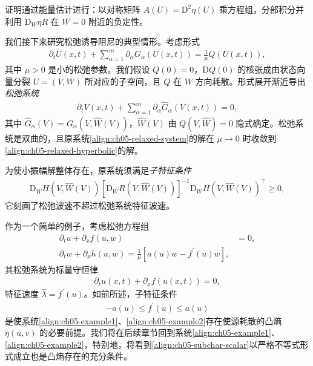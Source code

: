 \documentclass[../../main.tex]{subfiles}
\begin{document}
证明通过能量估计进行：以对称矩阵 $A(U)=\mathrm{D}^{2}\eta(U)$ 乘方程组，分部积分并利用 $\mathrm{D}_{W}\eta R$ 在 $W=0$ 附近的负定性。

我们接下来研究松弛诱导阻尼的典型情形。考虑形式
\begin{align}
\partial_{t}U(x,t)+\sum_{\alpha=1}^{m}\partial_{\alpha}G_{\alpha}(U(x,t))=\frac{1}{\mu}Q(U(x,t)),\label{align:ch05-relaxed-system}
\end{align}
其中 $\mu>0$ 是小的松弛参数。我们假设 $Q(0)=0$，$\mathrm{D}Q(0)$ 的核张成由状态向量分裂 $U=(V,W)$ 所对应的子空间，且 $Q$ 在 $W$ 方向耗散。形式展开渐近导出\emph{松弛系统}
\begin{align}
\partial_{t}V(x,t)+\sum_{\alpha=1}^{m}\partial_{\alpha}\hat{G}_{\alpha}(V(x,t))=0,\label{align:ch05-relaxed-hyperbolic}
\end{align}
其中 $\hat{G}_{\alpha}(V)=G_{\alpha}(V,\hat{W}(V))$，$\hat{W}(V)$ 由 $Q(V,\hat{W})=0$ 隐式确定。松弛系统是双曲的，且原系统\eqref{align:ch05-relaxed-system}的解在 $\mu\to0$ 时收敛到\eqref{align:ch05-relaxed-hyperbolic}的解。

为使小振幅解整体存在，原系统须满足\emph{子特征条件}
\begin{align}
\mathrm{D}_{W}H(V,\hat{W}(V))[\mathrm{D}_{W}R(V,\hat{W}(V))]^{-1}\mathrm{D}_{W}H(V,\hat{W}(V))^{\top}\geqslant0,\label{align:ch05-subcharacteristic}
\end{align}
它刻画了松弛波速不超过松弛系统特征波速。

作为一个简单的例子，考虑松弛方程组
\begin{align}
\partial_{t}u+\partial_{x}f(u,w)&=0,\label{align:ch05-example1}\\
\partial_{t}w+\partial_{x}h(u,w)=\frac{1}{\mu}[a(u)w-f^{\prime}(u)w],\label{align:ch05-example2}
\end{align}
其松弛系统为标量守恒律
\begin{align}
\partial_{t}u(x,t)+\partial_{x}f(u(x,t))=0,\label{align:ch05-relaxed-scalar}
\end{align}
特征速度 $\hat{\lambda}=f^{\prime}(u)$。如前所述，子特征条件
\begin{align}
-a(u)\leqslant f^{\prime}(u)\leqslant a(u)\label{align:ch05-subchar-scalar}
\end{align}
是使系统\eqref{align:ch05-example1}、\eqref{align:ch05-example2}存在使源耗散的凸熵 $\eta(u,v)$ 的必要前提。我们将在后续章节回到系统\eqref{align:ch05-example1}、\eqref{align:ch05-example2}，特别地，将看到\eqref{align:ch05-subchar-scalar}以严格不等式形式成立也是凸熵存在的充分条件。
\end{document}
